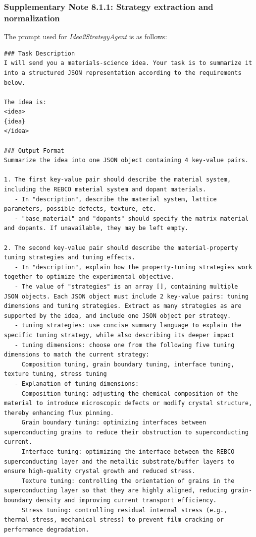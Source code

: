 \subsubsection*{Supplementary Note 8.1.1: Strategy extraction and normalization}
{}
The prompt used for \textit{Idea2StrategyAgent} is as follows:
\begin{lstlisting}[style=jsonstyle]
### Task Description
I will send you a materials-science idea. Your task is to summarize it into a structured JSON representation according to the requirements below.

The idea is:
<idea>
{idea}
</idea>

### Output Format
Summarize the idea into one JSON object containing 4 key-value pairs.

1. The first key-value pair should describe the material system, including the REBCO material system and dopant materials.
   - In "description", describe the material system, lattice parameters, possible defects, texture, etc.
   - "base_material" and "dopants" should specify the matrix material and dopants. If unavailable, they may be left empty.

2. The second key-value pair should describe the material-property tuning strategies and tuning effects.
   - In "description", explain how the property-tuning strategies work together to optimize the experimental objective.
   - The value of "strategies" is an array [], containing multiple JSON objects. Each JSON object must include 2 key-value pairs: tuning dimensions and tuning strategies. Extract as many strategies as are supported by the idea, and include one JSON object per strategy.
   - tuning strategies: use concise summary language to explain the specific tuning strategy, while also describing its deeper impact
   - tuning dimensions: choose one from the following five tuning dimensions to match the current strategy:
     Composition tuning, grain boundary tuning, interface tuning, texture tuning, stress tuning
   - Explanation of tuning dimensions:
     Composition tuning: adjusting the chemical composition of the material to introduce microscopic defects or modify crystal structure, thereby enhancing flux pinning.
     Grain boundary tuning: optimizing interfaces between superconducting grains to reduce their obstruction to superconducting current.
     Interface tuning: optimizing the interface between the REBCO superconducting layer and the metallic substrate/buffer layers to ensure high-quality crystal growth and reduced stress.
     Texture tuning: controlling the orientation of grains in the superconducting layer so that they are highly aligned, reducing grain-boundary density and improving current transport efficiency.
     Stress tuning: controlling residual internal stress (e.g., thermal stress, mechanical stress) to prevent film cracking or performance degradation.


\end{lstlisting}

